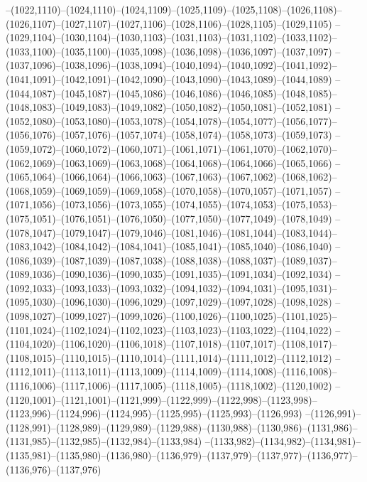 --(1022,1110)--(1024,1110)--(1024,1109)--(1025,1109)--(1025,1108)--(1026,1108)--(1026,1107)--(1027,1107)--(1027,1106)--(1028,1106)--(1028,1105)--(1029,1105)
--(1029,1104)--(1030,1104)--(1030,1103)--(1031,1103)--(1031,1102)--(1033,1102)--(1033,1100)--(1035,1100)--(1035,1098)--(1036,1098)--(1036,1097)--(1037,1097)
--(1037,1096)--(1038,1096)--(1038,1094)--(1040,1094)--(1040,1092)--(1041,1092)--(1041,1091)--(1042,1091)--(1042,1090)--(1043,1090)--(1043,1089)--(1044,1089)
--(1044,1087)--(1045,1087)--(1045,1086)--(1046,1086)--(1046,1085)--(1048,1085)--(1048,1083)--(1049,1083)--(1049,1082)--(1050,1082)--(1050,1081)--(1052,1081)
--(1052,1080)--(1053,1080)--(1053,1078)--(1054,1078)--(1054,1077)--(1056,1077)--(1056,1076)--(1057,1076)--(1057,1074)--(1058,1074)--(1058,1073)--(1059,1073)
--(1059,1072)--(1060,1072)--(1060,1071)--(1061,1071)--(1061,1070)--(1062,1070)--(1062,1069)--(1063,1069)--(1063,1068)--(1064,1068)--(1064,1066)--(1065,1066)
--(1065,1064)--(1066,1064)--(1066,1063)--(1067,1063)--(1067,1062)--(1068,1062)--(1068,1059)--(1069,1059)--(1069,1058)--(1070,1058)--(1070,1057)--(1071,1057)
--(1071,1056)--(1073,1056)--(1073,1055)--(1074,1055)--(1074,1053)--(1075,1053)--(1075,1051)--(1076,1051)--(1076,1050)--(1077,1050)--(1077,1049)--(1078,1049)
--(1078,1047)--(1079,1047)--(1079,1046)--(1081,1046)--(1081,1044)--(1083,1044)--(1083,1042)--(1084,1042)--(1084,1041)--(1085,1041)--(1085,1040)--(1086,1040)
--(1086,1039)--(1087,1039)--(1087,1038)--(1088,1038)--(1088,1037)--(1089,1037)--(1089,1036)--(1090,1036)--(1090,1035)--(1091,1035)--(1091,1034)--(1092,1034)
--(1092,1033)--(1093,1033)--(1093,1032)--(1094,1032)--(1094,1031)--(1095,1031)--(1095,1030)--(1096,1030)--(1096,1029)--(1097,1029)--(1097,1028)--(1098,1028)
--(1098,1027)--(1099,1027)--(1099,1026)--(1100,1026)--(1100,1025)--(1101,1025)--(1101,1024)--(1102,1024)--(1102,1023)--(1103,1023)--(1103,1022)--(1104,1022)
--(1104,1020)--(1106,1020)--(1106,1018)--(1107,1018)--(1107,1017)--(1108,1017)--(1108,1015)--(1110,1015)--(1110,1014)--(1111,1014)--(1111,1012)--(1112,1012)
--(1112,1011)--(1113,1011)--(1113,1009)--(1114,1009)--(1114,1008)--(1116,1008)--(1116,1006)--(1117,1006)--(1117,1005)--(1118,1005)--(1118,1002)--(1120,1002)
--(1120,1001)--(1121,1001)--(1121,999)--(1122,999)--(1122,998)--(1123,998)--(1123,996)--(1124,996)--(1124,995)--(1125,995)--(1125,993)--(1126,993)
--(1126,991)--(1128,991)--(1128,989)--(1129,989)--(1129,988)--(1130,988)--(1130,986)--(1131,986)--(1131,985)--(1132,985)--(1132,984)--(1133,984)
--(1133,982)--(1134,982)--(1134,981)--(1135,981)--(1135,980)--(1136,980)--(1136,979)--(1137,979)--(1137,977)--(1136,977)--(1136,976)--(1137,976)
